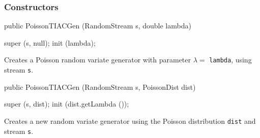 \subsubsection* {Constructors}
\begin{code}

   public PoissonTIACGen (RandomStream s, double lambda) \begin{hide} {
      super (s, null);
      init (lambda);
   }\end{hide}
\end{code}
  \begin{tabb} Creates a Poisson random variate generator with 
  parameter $\lambda = $ \texttt{lambda}, using stream \texttt{s}.  
 \end{tabb}
\begin{code}

   public PoissonTIACGen (RandomStream s, PoissonDist dist) \begin{hide} {
      super (s, dist);
      init (dist.getLambda ());
   }\end{hide}
\end{code}
  \begin{tabb}  Creates a new random variate generator using the Poisson 
    distribution \texttt{dist} and stream \texttt{s}. 
 \end{tabb}


